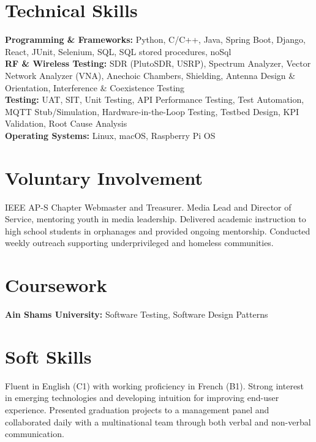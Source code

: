 \documentclass[letterpaper,11pt]{article}
\begin{document}
\section{Technical Skills}
 \begin{itemize}[leftmargin=0.15in, label={}]
    \small{\item{

\textbf{Programming \& Frameworks:} Python, C/C++, Java, Spring Boot, Django, React, JUnit, Selenium, SQL, SQL stored procedures, noSql \\

     

     \textbf{RF \& Wireless Testing:} SDR (PlutoSDR, USRP), Spectrum Analyzer, Vector Network Analyzer (VNA), Anechoic Chambers, Shielding, Antenna Design \& Orientation, Interference \& Coexistence Testing \\
     
  

     \textbf{Testing:} UAT, SIT, Unit Testing, API Performance Testing, Test Automation, MQTT Stub/Simulation, Hardware-in-the-Loop Testing, Testbed Design, KPI Validation, Root Cause Analysis \\
     
     \textbf{Operating Systems:} Linux, macOS, Raspberry Pi OS
    }}
 \end{itemize}

\section{Voluntary Involvement}
IEEE AP-S Chapter Webmaster and Treasurer. Media Lead and Director of Service, mentoring youth in media leadership. Delivered academic instruction to high school students in orphanages and provided ongoing mentorship. Conducted weekly outreach supporting underprivileged and homeless communities.



\section{Coursework}

\textbf{Ain Shams University:} Software Testing, Software Design Patterns


\section{Soft Skills}
Fluent in English (C1) with working proficiency in French (B1). Strong interest in emerging technologies and developing intuition for improving end-user experience. Presented graduation projects to a management panel and collaborated daily with a multinational team through both verbal and non-verbal communication.
\end{document}
